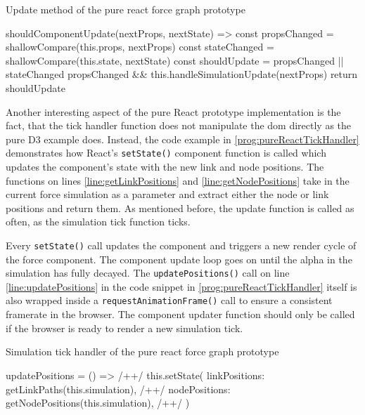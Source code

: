 \begin{program}
\caption{Update method of the pure react force graph prototype}
\label{prog:pureReactSimulationUpdate}
\begin{JsCode}
shouldComponentUpdate(nextProps, nextState) => {
  const propsChanged = shallowCompare(this.props, nextProps)
  const stateChanged = shallowCompare(this.state, nextState)
  const shouldUpdate = propsChanged || stateChanged
  propsChanged && this.handleSimulationUpdate(nextProps)
  return shouldUpdate
}
\end{JsCode}
\end{program}

Another interesting aspect of the pure React prototype implementation is the fact, that the tick handler function does not manipulate the dom directly as the pure D3 example does. Instead, the code example in \ref{prog:pureReactTickHandler} demonstrates how React's \texttt{setState()} component function is called which updates the component's state with the new link and node positions. The functions on lines \ref{line:getLinkPositions} and \ref{line:getNodePositions} take in the current force simulation as a parameter and extract either the node or link positions and return them. As mentioned before, the update function is called as often, as the simulation tick function ticks. 

Every \texttt{setState()} call updates the component and triggers a new render cycle of the force component. The component update loop goes on until the alpha in the simulation has fully decayed. The \texttt{updatePositions()} call on line \ref{line:updatePositions} in the code snippet in \ref{prog:pureReactTickHandler} itself is also wrapped inside a \texttt{requestAnimationFrame()} call to ensure a consistent framerate in the browser. The component updater function should only be called if the browser is ready to render a new simulation tick.

\begin{program}
\caption{Simulation tick handler of the pure react force graph prototype}
\label{prog:pureReactTickHandler}
\begin{JsCode}
updatePositions = () => { /+\label{line:updatePositions}+/
  this.setState({
    linkPositions: getLinkPaths(this.simulation), /+\label{line:getLinkPositions}+/
    nodePositions: getNodePositions(this.simulation), /+\label{line:getNodePositions}+/
  })
}
\end{JsCode}
\end{program}

